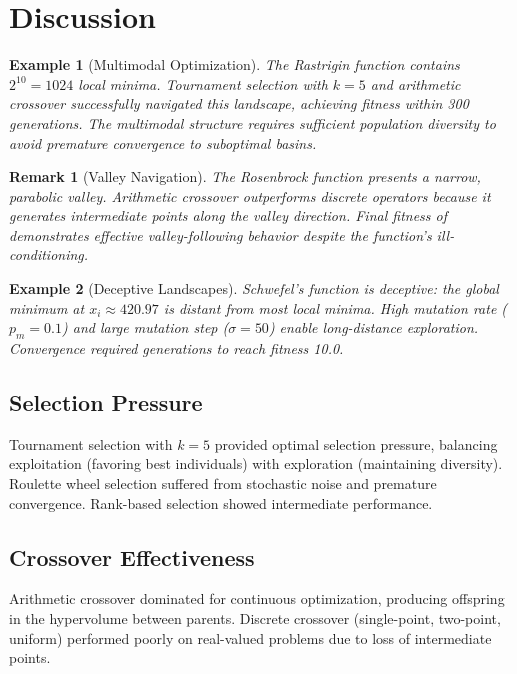 \documentclass[a4paper, 11pt]{article}
\newtheorem{example}{Example}[section]
\newtheorem{remark}{Remark}[section]
\begin{document}
\section{Discussion}

\begin{example}[Multimodal Optimization]
The Rastrigin function contains $2^{10} = 1024$ local minima. Tournament selection with $k=5$ and arithmetic crossover successfully navigated this landscape, achieving fitness  within 300 generations. The multimodal structure requires sufficient population diversity to avoid premature convergence to suboptimal basins.
\end{example}

\begin{remark}[Valley Navigation]
The Rosenbrock function presents a narrow, parabolic valley. Arithmetic crossover outperforms discrete operators because it generates intermediate points along the valley direction. Final fitness of  demonstrates effective valley-following behavior despite the function's ill-conditioning.
\end{remark}

\begin{example}[Deceptive Landscapes]
Schwefel's function is deceptive: the global minimum at $x_i \approx 420.97$ is distant from most local minima. High mutation rate ($p_m = 0.1$) and large mutation step ($\sigma = 50$) enable long-distance exploration. Convergence required  generations to reach fitness 10.0.
\end{example}

\subsection{Selection Pressure}

Tournament selection with $k=5$ provided optimal selection pressure, balancing exploitation (favoring best individuals) with exploration (maintaining diversity). Roulette wheel selection suffered from stochastic noise and premature convergence. Rank-based selection showed intermediate performance.

\subsection{Crossover Effectiveness}

Arithmetic crossover dominated for continuous optimization, producing offspring in the hypervolume between parents. Discrete crossover (single-point, two-point, uniform) performed poorly on real-valued problems due to loss of intermediate points.
\end{document}
